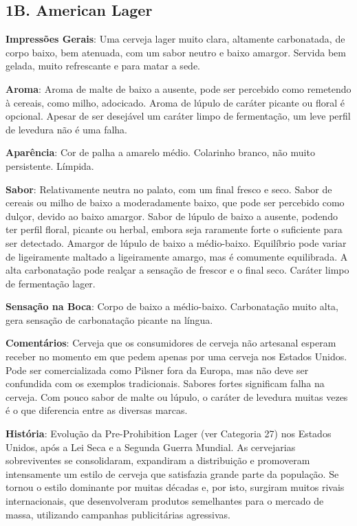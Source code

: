 \subsection*{1B. American Lager}
\textbf{Impressões Gerais}: Uma cerveja lager muito clara, altamente carbonatada, de corpo baixo, bem atenuada, com um sabor neutro e baixo amargor. Servida bem gelada, muito refrescante e para matar a sede.

\textbf{Aroma}: Aroma de malte de baixo a ausente, pode ser percebido como remetendo à cereais, como milho, adocicado. Aroma de lúpulo de caráter picante ou floral é opcional. Apesar de ser desejável um caráter limpo de fermentação, um leve perfil de levedura não é uma falha.

\textbf{Aparência}: Cor de palha a amarelo médio. Colarinho branco, não muito persistente. Límpida.

\textbf{Sabor}: Relativamente neutra no palato, com um final fresco e seco. Sabor de cereais ou milho de baixo a moderadamente baixo, que pode ser percebido como dulçor, devido ao baixo amargor. Sabor de lúpulo de baixo a ausente, podendo ter perfil floral, picante ou herbal, embora seja raramente forte o suficiente para ser detectado. Amargor de lúpulo de baixo a médio-baixo. Equilíbrio pode variar de ligeiramente maltado a ligeiramente amargo, mas é comumente equilibrada. A alta carbonatação pode realçar a sensação de frescor e o final seco. Caráter limpo de fermentação lager.

\textbf{Sensação na Boca}: Corpo de baixo a médio-baixo. Carbonatação muito alta, gera sensação de carbonatação picante na língua.

\textbf{Comentários}: Cerveja que os consumidores de cerveja não artesanal esperam receber no momento em que pedem apenas por uma cerveja nos Estados Unidos. Pode ser comercializada como Pilsner fora da Europa, mas não deve ser confundida com os exemplos tradicionais. Sabores fortes significam falha na cerveja. Com pouco sabor de malte ou lúpulo, o caráter de levedura muitas vezes é o que diferencia entre as diversas marcas.

\textbf{História}: Evolução da Pre-Prohibition Lager (ver Categoria 27) nos Estados Unidos, após a Lei Seca e a Segunda Guerra Mundial. As cervejarias sobreviventes se consolidaram, expandiram a distribuição e promoveram intensamente um estilo de cerveja que satisfazia grande parte da população. Se tornou o estilo dominante por muitas décadas e, por isto, surgiram muitos rivais internacionais, que desenvolveram produtos semelhantes para o mercado de massa, utilizando campanhas publicitárias agressivas.

